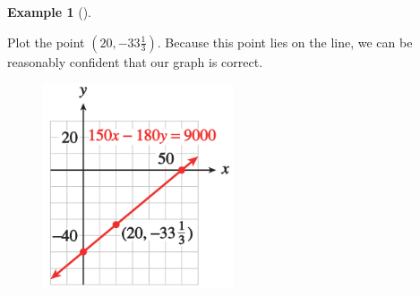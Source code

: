 \documentclass[10pt,]{book}
\theoremstyle{plain}
\theoremstyle{definition}
\theoremstyle{definition}
\newtheorem{example}[theorem]{Example}
\numberwithin{equation}{section}
\begin{document}
\begin{example}[]
\begin{enumerate}[label=*\alph**]
            Plot the point \((20, −33\frac{1}{3})\). Because this point lies on the line, we can be reasonably confident that our graph is correct. 
            \leavevmode%
\begin{figure}
\centering
\includegraphics[width=0.50\textwidth,]{images/fig-example-graph-intercepts.svg}\caption{\label{fig-example-graph-intercepts}}
\end{figure}

\end{enumerate}
\end{example}
\end{document}
